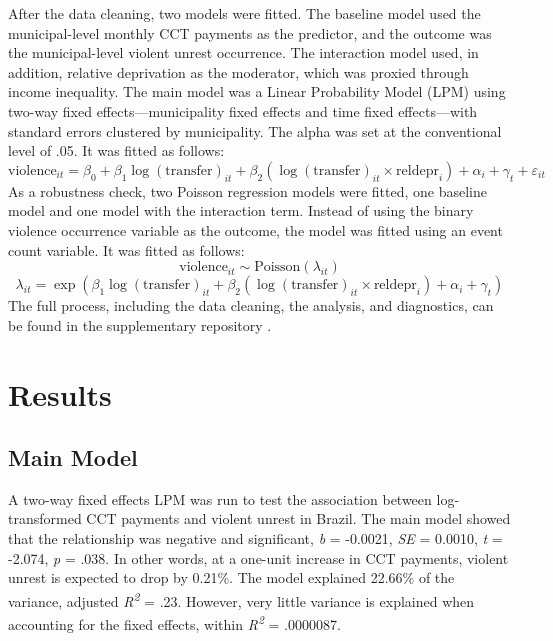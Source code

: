 \documentclass[stu,12pt]{apa7}
\begin{document}
After the data cleaning, two models were fitted. The baseline model used the municipal-level monthly CCT payments as the predictor, and the outcome was the municipal-level violent unrest occurrence. The interaction model used, in addition, relative deprivation as the moderator, which was proxied through income inequality. The main model was a Linear Probability Model (LPM) using two-way fixed effects—municipality fixed effects and time fixed effects—with standard errors clustered by municipality. The alpha was set at the conventional level of .05. It was fitted as follows:
\begin{equation}
\text{violence}_{it} = \beta_0 + \beta_1 \log(\text{transfer})_{it} + \beta_2 \left( \log(\text{transfer})_{it} \times \text{reldepr}_i \right) + \alpha_i + \gamma_t + \varepsilon_{it}
\end{equation}
As a robustness check, two Poisson regression models were fitted, one baseline model and one model with the interaction term. Instead of using the binary violence occurrence variable as the outcome, the model was fitted using an event count variable. It was fitted as follows:
\begin{equation}
\text{violence}_{it} \sim \text{Poisson}(\lambda_{it})
\end{equation}
\begin{equation}
\lambda_{it} = \exp\left( \beta_1 \log(\text{transfer})_{it} + \beta_2 \left( \log(\text{transfer})_{it} \times \text{reldepr}_i \right) + \alpha_i + \gamma_t \right)
\end{equation}
The full process, including the data cleaning, the analysis, and diagnostics, can be found in the supplementary repository \parencite{zotero-item-1650}.

\section{Results}

\subsection{Main Model}

A two-way fixed effects LPM was run to test the association between log-transformed CCT payments and violent unrest in Brazil. The main model showed that the relationship was negative and significant, \textit{b} = -0.0021, \textit{SE} = 0.0010, \textit{t} = -2.074, \textit{p} = .038. In other words, at a one-unit increase in CCT payments, violent unrest is expected to drop by 0.21\%. The model explained 22.66\% of the variance, adjusted \textit{R}\textit{\textsuperscript{2}} = .23. However, very little variance is explained when accounting for the fixed effects, within \textit{R}\textit{\textsuperscript{2}} = .0000087.
\end{document}
